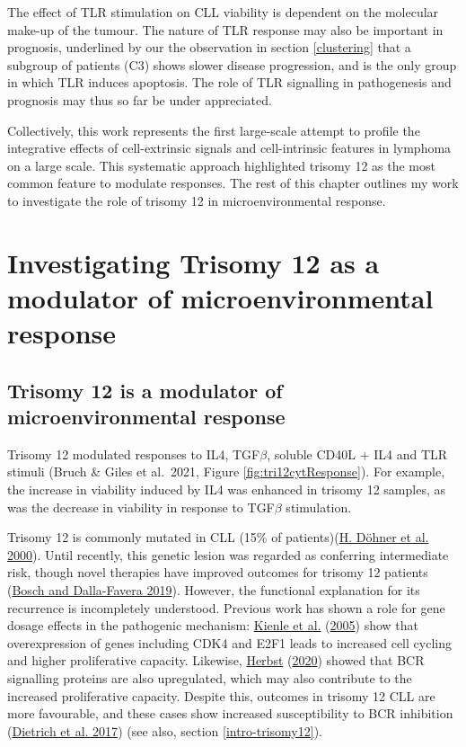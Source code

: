 \documentclass[11pt, a4paper, twosided]{book}
\begin{document}
The effect of TLR stimulation on CLL viability is dependent on the molecular make-up of the tumour. The nature of TLR response may also be important in prognosis, underlined by our the observation in section \ref{clustering} that a subgroup of patients (C3) shows slower disease progression, and is the only group in which TLR induces apoptosis. The role of TLR signalling in pathogenesis and prognosis may thus so far be under appreciated.

Collectively, this work represents the first large-scale attempt to profile the integrative effects of cell-extrinsic signals and cell-intrinsic features in lymphoma on a large scale. This systematic approach highlighted trisomy 12 as the most common feature to modulate responses. The rest of this chapter outlines my work to investigate the role of trisomy 12 in microenvironmental response.

\hypertarget{investigating-trisomy-12-as-a-modulator-of-microenvironmental-response}{%
\section{Investigating Trisomy 12 as a modulator of microenvironmental response}\label{investigating-trisomy-12-as-a-modulator-of-microenvironmental-response}}

\hypertarget{trisomy12-modulator}{%
\subsection{Trisomy 12 is a modulator of microenvironmental response}\label{trisomy12-modulator}}

Trisomy 12 modulated responses to IL4, TGF\(\beta\), soluble CD40L + IL4 and TLR stimuli (Bruch \& Giles et al.~2021, Figure \ref{fig:tri12cytResponse}). For example, the increase in viability induced by IL4 was enhanced in trisomy 12 samples, as was the decrease in viability in response to TGF\(\beta\) stimulation.

Trisomy 12 is commonly mutated in CLL (15\% of patients)(\protect\hyperlink{ref-Dohner2000}{H. Döhner et al. 2000}). Until recently, this genetic lesion was regarded as conferring intermediate risk, though novel therapies have improved outcomes for trisomy 12 patients (\protect\hyperlink{ref-Bosch2019}{Bosch and Dalla-Favera 2019}). However, the functional explanation for its recurrence is incompletely understood. Previous work has shown a role for gene dosage effects in the pathogenic mechanism: \protect\hyperlink{ref-Kienle2005}{Kienle et al.} (\protect\hyperlink{ref-Kienle2005}{2005}) show that overexpression of genes including CDK4 and E2F1 leads to increased cell cycling and higher proliferative capacity. Likewise, \protect\hyperlink{ref-HerbstThesis}{Herbst} (\protect\hyperlink{ref-HerbstThesis}{2020}) showed that BCR signalling proteins are also upregulated, which may also contribute to the increased proliferative capacity. Despite this, outcomes in trisomy 12 CLL are more favourable, and these cases show increased susceptibility to BCR inhibition (\protect\hyperlink{ref-JCIpaper}{Dietrich et al. 2017}) (see also, section \ref{intro-trisomy12}).
\end{document}

